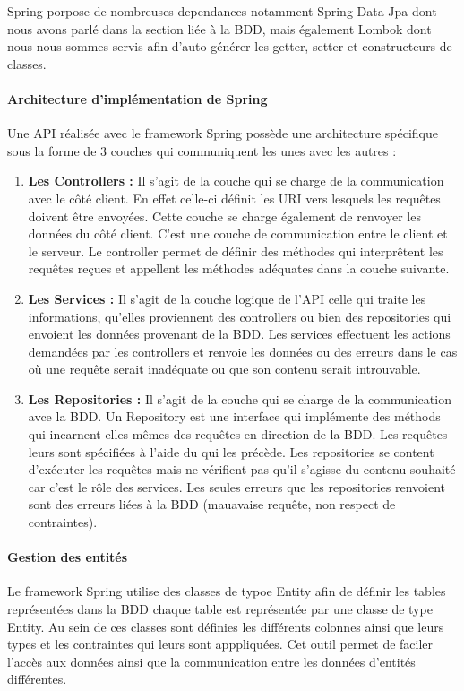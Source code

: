 \documentclass[../rapport.tex]{subfiles}
\begin{document}
\medskip

Spring porpose de nombreuses dependances notamment Spring Data Jpa dont nous avons parlé dans la section liée à la BDD, mais également Lombok dont nous nous sommes servis afin d'auto générer
les getter, setter et constructeurs de classes. 

\paragraph{Architecture d'implémentation de Spring}

Une API réalisée avec le framework Spring possède une architecture spécifique sous la forme de 3 couches qui communiquent les unes avec les autres :

\medskip
\begin{enumerate}
	\item\textbf{Les Controllers : } Il s'agit de la couche qui se charge de la communication avec le côté client. En effet celle-ci définit les URI vers lesquels les requêtes doivent être
		envoyées. Cette couche se charge également de renvoyer les données du côté client. C'est une couche de communication entre le client et le serveur. Le controller permet de définir
		des méthodes qui interprêtent les requêtes reçues et appellent les méthodes adéquates dans la couche suivante.
	\item\textbf{Les Services : } Il s'agit de la couche logique de l'API celle qui traite les informations, qu'elles proviennent des controllers ou bien des repositories qui envoient les données
		provenant de la BDD. Les services effectuent les actions demandées par les controllers et renvoie les données ou des erreurs dans le cas où une requête serait inadéquate ou que son contenu 
		serait introuvable.
	\item\textbf{Les Repositories : } Il s'agit de la couche qui se charge de la communication avce la BDD. Un Repository est une interface qui implémente des méthods qui incarnent elles-mêmes
		des requêtes en direction de la BDD. Les requêtes leurs sont spécifiées à l'aide du \@Query qui les précède. Les repositories se content d'exécuter les requêtes mais ne vérifient pas qu'il
		s'agisse du contenu souhaité car c'est le rôle des services. Les seules erreurs que les repositories renvoient sont des erreurs liées à la BDD (mauavaise requête, non respect de contraintes).
\end{enumerate}

\paragraph{Gestion des entités}
Le framework Spring utilise des classes de typoe Entity afin de définir les tables représentées dans la BDD chaque table est représentée par une classe de type Entity. Au sein de ces classes sont
définies les différents colonnes ainsi que leurs types et les contraintes qui leurs sont apppliquées. Cet outil permet de faciler l'accès aux données ainsi que la communication entre les données
d'entités différentes.
\end{document}
